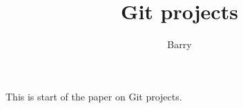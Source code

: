 \documentclass[10pt]{article}
\author{Barry}
\title{Git projects}
\begin{document}
	\makefile

	This is start of the paper on Git projects.
\end{document}
